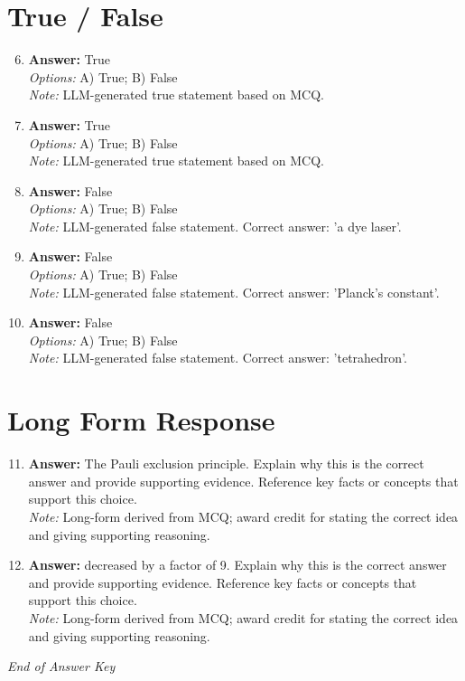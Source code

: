 \documentclass[12pt]{article}
\begin{document}
\section*{True / False}
\begin{enumerate}[label=\arabic*.]
\setcounter{enumi}{5}
\item \textbf{Answer:} True
\\ \textit{Options:} A) True; B) False
\\ \textit{Note:} LLM-generated true statement based on MCQ.
\item \textbf{Answer:} True
\\ \textit{Options:} A) True; B) False
\\ \textit{Note:} LLM-generated true statement based on MCQ.
\item \textbf{Answer:} False
\\ \textit{Options:} A) True; B) False
\\ \textit{Note:} LLM-generated false statement. Correct answer: 'a dye laser'.
\item \textbf{Answer:} False
\\ \textit{Options:} A) True; B) False
\\ \textit{Note:} LLM-generated false statement. Correct answer: 'Planck's constant'.
\item \textbf{Answer:} False
\\ \textit{Options:} A) True; B) False
\\ \textit{Note:} LLM-generated false statement. Correct answer: 'tetrahedron'.
\end{enumerate}

\section*{Long Form Response}
\begin{enumerate}[label=\arabic*.]
\setcounter{enumi}{10}
\item \textbf{Answer:} The Pauli exclusion principle. Explain why this is the correct answer and provide supporting evidence. Reference key facts or concepts that support this choice.
\\ \textit{Note:} Long-form derived from MCQ; award credit for stating the correct idea and giving supporting reasoning.
\item \textbf{Answer:} decreased by a factor of 9. Explain why this is the correct answer and provide supporting evidence. Reference key facts or concepts that support this choice.
\\ \textit{Note:} Long-form derived from MCQ; award credit for stating the correct idea and giving supporting reasoning.
\end{enumerate}

\vfill
\noindent\textit{End of Answer Key}
\end{document}
